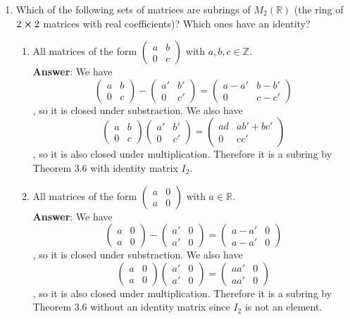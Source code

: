 \documentclass{article}
\begin{document}
\begin{enumerate}
      \item Which of the following sets of matrices are subrings of $M_2(\mathbb{R})$ (the ring of $2\cross 2$ matrices with real coefficients)? Which ones have an identity?
            \begin{enumerate}[start=2]
                  \item All matrices of the form $\begin{pmatrix}a&b\\0&c\end{pmatrix}$ with $a,b,c\in\mathbb{Z}$.\\
                        \textbf{Answer}: We have \[\begin{pmatrix}a&b\\0&c\end{pmatrix}-\begin{pmatrix}a'&b'\\0&c'\end{pmatrix}=\begin{pmatrix}a-a'&b-b'\\0&c-c'\end{pmatrix}\], so it is closed under substraction. We also have \[\begin{pmatrix}a&b\\0&c\end{pmatrix}\begin{pmatrix}a'&b'\\0&c'\end{pmatrix}=\begin{pmatrix}ad&ab'+bc'\\0&cc'\end{pmatrix}\], so it is also closed under multiplication. Therefore it is a subring by Theorem 3.6 with identity matrix $I_2$.
                  \item All matrices of the form $\begin{pmatrix}a&0\\a&0\end{pmatrix}$ with $a\in\mathbb{R}$.\\
                        \textbf{Answer}: We have \[\begin{pmatrix}a&0\\a&0\end{pmatrix}-\begin{pmatrix}a'&0\\a'&0\end{pmatrix}=\begin{pmatrix}a-a'&0\\a-a'&0\end{pmatrix}\], so it is closed under substraction. We also have \[\begin{pmatrix}a&0\\a&0\end{pmatrix}\begin{pmatrix}a'&0\\a'&0\end{pmatrix}=\begin{pmatrix}aa'&0\\aa'&0\end{pmatrix}\], so it is also closed under multiplication. Therefore it is a subring by Theorem 3.6 without an identity matrix since $I_2$ is not an element.

\end{enumerate}
\end{enumerate}
\end{document}
